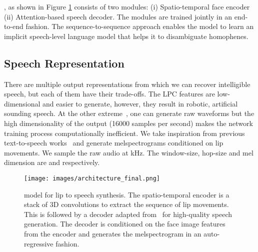 \documentclass[10pt,twocolumn,letterpaper]{article}
\begin{document}
\modelnamewithoutspace, as shown in Figure \ref{fig:architecture} consists of two modules: (i) Spatio-temporal face encoder (ii) Attention-based speech decoder. The modules are trained jointly in an end-to-end fashion. The sequence-to-sequence approach enables the model to learn an implicit speech-level language model that helps it to disambiguate homophenes. 

\subsection{Speech Representation} There are multiple output representations from which we can recover intelligible speech, but each of them have their trade-offs. The LPC features are low-dimensional and easier to generate, however, they result in robotic, artificial sounding speech. At the other extreme~\cite{vougioukas2019video}, one can generate raw waveforms but the high dimensionality of the output (16000 samples per second) makes the network training process computationally inefficient. We take inspiration from previous text-to-speech works~\cite{ping2017deep,shen2018natural} and generate melspectrograms conditioned on lip movements. We sample the raw audio at kHz. The window-size, hop-size and mel dimension are  and  respectively.

\begin{figure}[h]
  \texttt{[image: images/architecture\_final.png]}\caption{\modelname model for lip to speech synthesis. The spatio-temporal encoder is a stack of 3D convolutions to extract the sequence of lip movements. This is followed by a decoder adapted from~\cite{shen2018natural} for high-quality speech generation. The decoder is conditioned on the face image features from the encoder and generates the melspectrogram in an auto-regressive fashion.}
  \label{fig:architecture}
\end{figure}
\end{document}
